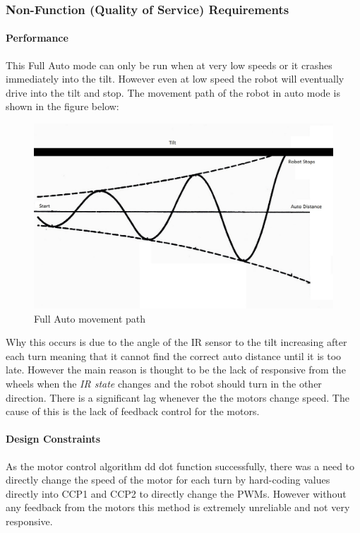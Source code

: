 \documentclass{article}
\begin{document}
	
	\subsubsection{Non-Function (Quality of Service) Requirements}
	\paragraph{Performance}
	
	This Full Auto mode can only be run when at very low speeds or it crashes immediately into the tilt. However even at low speed the robot will eventually drive into the tilt and stop. The movement path of the robot in auto mode is shown in the figure below:
	
	 	\begin{figure}[h]
	 		\includegraphics[scale=0.3]{auto_movement.jpg}
	 		\centering
	 		\caption{Full Auto movement path}
	 	\end{figure}
	
	Why this occurs is due to the angle of the IR sensor to the tilt increasing after each turn meaning that it cannot find the correct auto distance until it is too late. However the main reason is thought to be the lack of responsive from the wheels when the \textit{IR state} changes and the robot should turn in the other direction. There is a significant lag whenever the the motors change speed. The cause of this is the lack of feedback control for the motors. 
	
	
	\paragraph{Design Constraints}
	As the motor control algorithm dd dot function successfully, there was a need to directly change the speed of the motor for each turn by hard-coding values directly into CCP1 and CCP2 to directly change the PWMs. However without any feedback from the motors this method is extremely unreliable and not very responsive.
	
\end{document}
